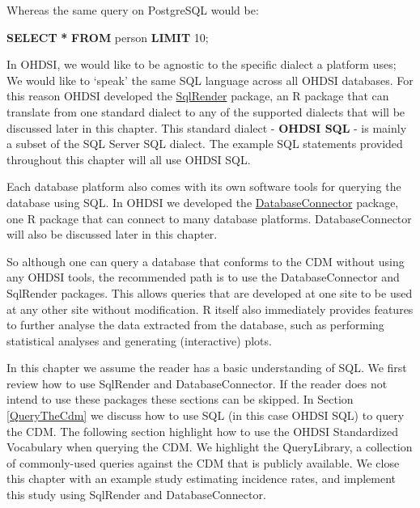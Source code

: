 \documentclass[11pt]{book}
\newenvironment{Shaded}{\begin{snugshade}}{\end{snugshade}}
\newcommand{\DecValTok}[1]{\textcolor[rgb]{0.00,0.00,0.81}{#1}}
\newcommand{\KeywordTok}[1]{\textcolor[rgb]{0.13,0.29,0.53}{\textbf{#1}}}
\newcommand{\NormalTok}[1]{#1}
\newcommand{\OperatorTok}[1]{\textcolor[rgb]{0.81,0.36,0.00}{\textbf{#1}}}
\theoremstyle{definition}
\theoremstyle{definition}
\theoremstyle{definition}
\theoremstyle{remark}
\begin{document}
Whereas the same query on PostgreSQL would be:

\begin{Shaded}
\begin{Highlighting}[]
\KeywordTok{SELECT} \OperatorTok{*} \KeywordTok{FROM}\NormalTok{ person }\KeywordTok{LIMIT} \DecValTok{10}\NormalTok{;}
\end{Highlighting}
\end{Shaded}

In OHDSI, we would like to be agnostic to the specific dialect a platform uses; We would like to `speak' the same SQL language across all OHDSI databases. For this reason OHDSI developed the \href{https://ohdsi.github.io/SqlRender/}{SqlRender} package, an R package that can translate from one standard dialect to any of the supported dialects that will be discussed later in this chapter. This standard dialect - \textbf{OHDSI SQL} - is mainly a subset of the SQL Server SQL dialect. The example SQL statements provided throughout this chapter will all use OHDSI SQL.

Each database platform also comes with its own software tools for querying the database using SQL. In OHDSI we developed the \href{https://ohdsi.github.io/DatabaseConnector/}{DatabaseConnector} package, one R package that can connect to many database platforms. DatabaseConnector will also be discussed later in this chapter.

So although one can query a database that conforms to the CDM without using any OHDSI tools, the recommended path is to use the DatabaseConnector and SqlRender packages. This allows queries that are developed at one site to be used at any other site without modification. R itself also immediately provides features to further analyse the data extracted from the database, such as performing statistical analyses and generating (interactive) plots.

In this chapter we assume the reader has a basic understanding of SQL. We first review how to use SqlRender and DatabaseConnector. If the reader does not intend to use these packages these sections can be skipped. In Section \ref{QueryTheCdm} we discuss how to use SQL (in this case OHDSI SQL) to query the CDM. The following section highlight how to use the OHDSI Standardized Vocabulary when querying the CDM. We highlight the QueryLibrary, a collection of commonly-used queries against the CDM that is publicly available. We close this chapter with an example study estimating incidence rates, and implement this study using SqlRender and DatabaseConnector.
\end{document}
